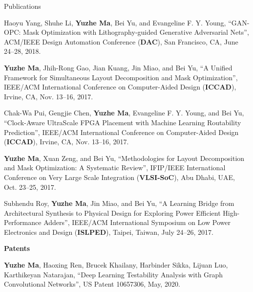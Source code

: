 \begin{rSection}{Publications}
\begin{description}[font=\normalfont]
\item[{[C5]}]{
	Haoyu Yang, Shuhe Li, \textbf{Yuzhe Ma}, Bei Yu, and Evangeline F. Y. Young,
	``GAN-OPC: Mask Optimization with Lithography-guided Generative Adversarial Nets'',
	ACM/IEEE Design Automation Conference (\textbf{DAC}), San Francisco, CA, June 24--28, 2018.
}

\item[{[C4]}]{
	\textbf{Yuzhe Ma}, Jhih-Rong Gao, Jian Kuang, Jin Miao, and Bei Yu,
	``A Unified Framework for Simultaneous Layout Decomposition and Mask Optimization'',
	IEEE/ACM International Conference on Computer-Aided Design (\textbf{ICCAD}), Irvine, CA, Nov. 13--16, 2017.
}

\item[{[C3]}]{
	Chak-Wa Pui, Gengjie Chen, \textbf{Yuzhe Ma}, Evangeline F. Y. Young, and Bei Yu,
	``Clock-Aware UltraScale FPGA Placement with Machine Learning Routability Prediction'',
	IEEE/ACM International Conference on Computer-Aided Design (\textbf{ICCAD}), Irvine, CA, Nov. 13--16, 2017.
}

\item[{[C2]}]{
    \textbf{Yuzhe Ma}, Xuan Zeng, and Bei Yu,
    ``Methodologies for Layout Decomposition and Mask Optimization: A Systematic Review'',
        IFIP/IEEE International Conference on Very Large Scale Integration (\textbf{VLSI-SoC}), Abu Dhabi, UAE, Oct. 23--25, 2017. %
}

\item[{[C1]}]{
    Subhendu Roy, \textbf{Yuzhe Ma}, Jin Miao, and Bei Yu,
    ``A Learning Bridge from Architectural Synthesis to Physical Design for Exploring Power Efficient High-Performance Adders'',
    IEEE/ACM International Symposium on Low Power Electronics and Design (\textbf{ISLPED}), Taipei, Taiwan, July 24--26, 2017.
}

\end{description}

\textbf{Patents}
\begin{description}[font=\normalfont]
\item[{[P1]}]{
    \textbf{Yuzhe Ma}, Haoxing Ren, Brucek Khailany, Harbinder Sikka, Lijuan Luo, Karthikeyan Natarajan,
    ``Deep Learning Testability Analysis with Graph Convolutional Networks'',
    US Patent 10657306, May, 2020.
}
\end{description}


\end{rSection}
